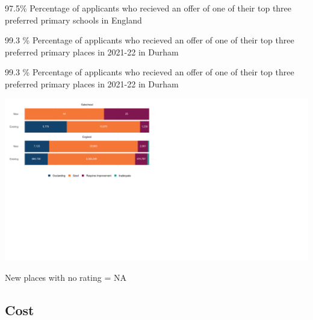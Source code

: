 \documentclass[
]{article}
\begin{document}
\begin{tcolorbox}[colback=gssmidblue, 
 leftright skip=0.1cm,
 coltext=white, 
 halign=left, 
 fontupper={\Huge \bfseries},
 fontlower={\large \bfseries},
 sharp corners, 
 colframe=gssmidblue,
 width=0.32\linewidth,
 boxrule=0pt 
 ]
97.5\%
\tcblower
Percentage of applicants who recieved an offer of one of their top three preferred primary schools in England
\end{tcolorbox}
\begin{tcolorbox}[colback=gssmidblue, 
 leftright skip=0.1cm,
 coltext=white, 
 halign=left, 
 fontupper={\Huge \bfseries},
 fontlower={\large \bfseries},
 sharp corners, 
 colframe=gssmidblue,
 width=0.32\linewidth,
 boxrule=0pt 
 ]
 99.3 \%
\tcblower
Percentage of applicants who recieved an offer of one of their top three preferred  primary  places in  2021-22  in  Durham 
\end{tcolorbox}\begin{tcolorbox}[colback=gssmidblue, 
 leftright skip=0.1cm,
 coltext=white, 
 halign=left, 
 fontupper={\Huge \bfseries},
 fontlower={\large \bfseries},
 sharp corners, 
 colframe=gssmidblue,
 width=0.32\linewidth,
 boxrule=0pt 
 ]
 99.3 \%
\tcblower
Percentage of applicants who recieved an offer of one of their top three preferred  primary  places in  2021-22  in  Durham 
\end{tcolorbox}

\includegraphics{Summary_scorecard_files/figure-latex/quality_chart-1.pdf}

New places with no rating = NA

\hypertarget{cost}{%
\subsection{Cost}\label{cost}}
\end{document}
